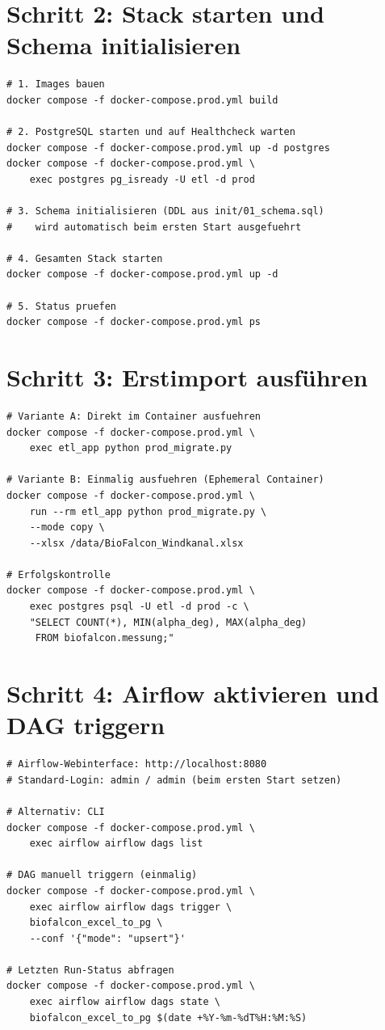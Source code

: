 ﻿\documentclass[12pt,a4paper]{report}
\theoremstyle{definition}
\theoremstyle{remark}
\begin{document}
\section{Schritt 2: Stack starten und Schema initialisieren}

\begin{lstlisting}[style=bash, caption={Deployment: Stack starten}]
# 1. Images bauen
docker compose -f docker-compose.prod.yml build

# 2. PostgreSQL starten und auf Healthcheck warten
docker compose -f docker-compose.prod.yml up -d postgres
docker compose -f docker-compose.prod.yml \
    exec postgres pg_isready -U etl -d prod

# 3. Schema initialisieren (DDL aus init/01_schema.sql)
#    wird automatisch beim ersten Start ausgefuehrt

# 4. Gesamten Stack starten
docker compose -f docker-compose.prod.yml up -d

# 5. Status pruefen
docker compose -f docker-compose.prod.yml ps
\end{lstlisting}

\section{Schritt 3: Erstimport ausführen}

\begin{lstlisting}[style=bash, caption={Erstimport: Vollstaendige Migration der Excel-Quelldatei}]
# Variante A: Direkt im Container ausfuehren
docker compose -f docker-compose.prod.yml \
    exec etl_app python prod_migrate.py

# Variante B: Einmalig ausfuehren (Ephemeral Container)
docker compose -f docker-compose.prod.yml \
    run --rm etl_app python prod_migrate.py \
    --mode copy \
    --xlsx /data/BioFalcon_Windkanal.xlsx

# Erfolgskontrolle
docker compose -f docker-compose.prod.yml \
    exec postgres psql -U etl -d prod -c \
    "SELECT COUNT(*), MIN(alpha_deg), MAX(alpha_deg)
     FROM biofalcon.messung;"
\end{lstlisting}

\section{Schritt 4: Airflow aktivieren und DAG triggern}

\begin{lstlisting}[style=bash, caption={Airflow: DAG aktivieren und manuell triggern}]
# Airflow-Webinterface: http://localhost:8080
# Standard-Login: admin / admin (beim ersten Start setzen)

# Alternativ: CLI
docker compose -f docker-compose.prod.yml \
    exec airflow airflow dags list

# DAG manuell triggern (einmalig)
docker compose -f docker-compose.prod.yml \
    exec airflow airflow dags trigger \
    biofalcon_excel_to_pg \
    --conf '{"mode": "upsert"}'

# Letzten Run-Status abfragen
docker compose -f docker-compose.prod.yml \
    exec airflow airflow dags state \
    biofalcon_excel_to_pg $(date +%Y-%m-%dT%H:%M:%S)
\end{lstlisting}
\end{document}
